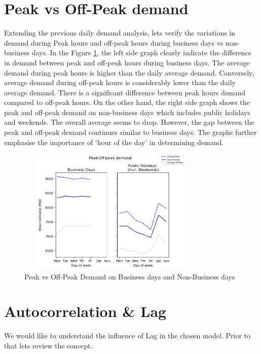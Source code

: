 \documentclass[mstat,12pt]{unswthesis}
\begin{document}
\hypertarget{peak-vs-off-peak-demand}{%
\section{Peak vs Off-Peak demand}\label{peak-vs-off-peak-demand}}

Extending the previous daily demand analysis, lets verify the variations
in demand during Peak hours and off-peak hours during business days vs
non-business days. In the Figure \ref{holiday_nonholiday}, the left side
graph clearly indicate the difference in demand between peak and
off-peak hours during business days. The average demand during peak
hours is higher than the daily average demand. Conversely, average
demand during off-peak hours is considerably lower than the daily
average demand. There is a significant difference between peak hours
demand compared to off-peak hours. On the other hand, the right side
graph shows the peak and off-peak demand on non-business days which
includes public holidays and weekends. The overall average seems to
drop. However, the gap between the peak and off-peak demand continues
similar to business days. The graphs further emphasise the importance of
`hour of the day' in determining demand.

\begin{figure}[H]
\centering
\includegraphics[width=0.80\textwidth,height=6cm]{holiday_nonholiday.png}
\caption{Peak vs Off-Peak Demand on Business days and Non-Business days}
\label{holiday_nonholiday}
\end{figure}

\hypertarget{autocorrelation-lag}{%
\section{Autocorrelation \& Lag}\label{autocorrelation-lag}}

We would like to understand the influence of Lag in the chosen model.
Prior to that lets review the concept.
\end{document}
